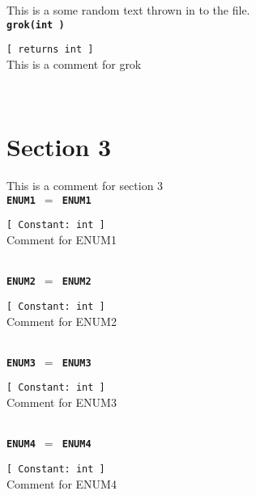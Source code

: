 This is a some random text thrown in to the file.\\

{\tt \bf grok(int ) }
\\
\makebox[0.5in]{}\begin{minipage}[t]{6in}
{\tt [ returns int  ]  }\\
   This is a comment for grok   
\\

\end{minipage}\\

\section{Section 3}   This is a comment for section 3   
\\{\tt \bf ENUM1 $=$ ENUM1 }
\\
\makebox[0.5in]{}\begin{minipage}[t]{6in}
{\tt [ Constant: int  ]  }\\
   Comment for ENUM1   
\\

\end{minipage}\\

{\tt \bf ENUM2 $=$ ENUM2 }
\\
\makebox[0.5in]{}\begin{minipage}[t]{6in}
{\tt [ Constant: int  ]  }\\
   Comment for ENUM2   
\\

\end{minipage}\\

{\tt \bf ENUM3 $=$ ENUM3 }
\\
\makebox[0.5in]{}\begin{minipage}[t]{6in}
{\tt [ Constant: int  ]  }\\
   Comment for ENUM3   
\\

\end{minipage}\\

{\tt \bf ENUM4 $=$ ENUM4 }
\\
\makebox[0.5in]{}\begin{minipage}[t]{6in}
{\tt [ Constant: int  ]  }\\
   Comment for ENUM4   
\\

\end{minipage}\\

